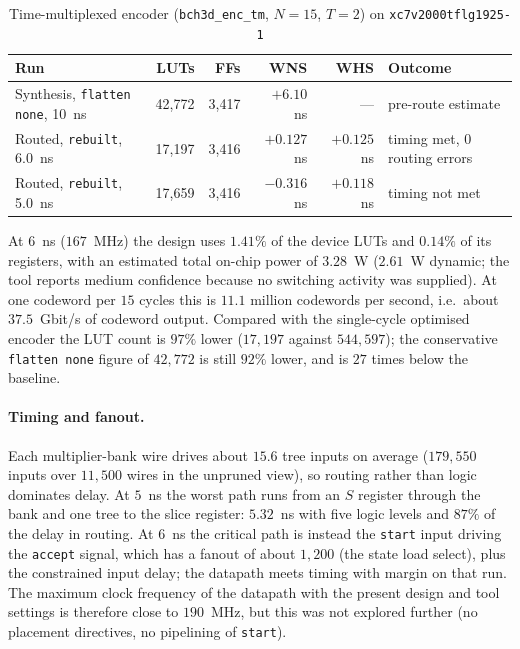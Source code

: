 \documentclass[11pt,a4paper]{article}
\begin{document}
\begin{table}[htbp]
\centering
\caption{Time-multiplexed encoder (\texttt{bch3d\_enc\_tm}, $N=15$, $T=2$) on \texttt{xc7v2000tflg1925-1}}
\label{tab:tm_results}
\vspace{0.2cm}
\begin{tabular}{lrrrrl}
\toprule
\textbf{Run} & \textbf{LUTs} & \textbf{FFs} & \textbf{WNS} & \textbf{WHS} & \textbf{Outcome} \\
\midrule
Synthesis, \texttt{flatten none}, 10~ns & 42,772 & 3,417 & $+6.10$~ns & --- & pre-route estimate \\
Routed, \texttt{rebuilt}, 6.0~ns & 17,197 & 3,416 & $+0.127$~ns & $+0.125$~ns & timing met, 0 routing errors \\
Routed, \texttt{rebuilt}, 5.0~ns & 17,659 & 3,416 & $-0.316$~ns & $+0.118$~ns & timing not met \\
\bottomrule
\end{tabular}
\end{table}

At $6$~ns ($167$~MHz) the design uses $1.41\%$ of the device LUTs and $0.14\%$ of its registers, with an estimated total on-chip power of $3.28$~W ($2.61$~W dynamic; the tool reports medium confidence because no switching activity was supplied). At one codeword per $15$ cycles this is $11.1$ million codewords per second, i.e.\ about $37.5$~Gbit/s of codeword output. Compared with the single-cycle optimised encoder the LUT count is $97\%$ lower ($17,197$ against $544,597$); the conservative \texttt{flatten none} figure of $42,772$ is still $92\%$ lower, and is $27$ times below the baseline.

\paragraph{Timing and fanout.} Each multiplier-bank wire drives about $15.6$ tree inputs on average ($179,550$ inputs over $11,500$ wires in the unpruned view), so routing rather than logic dominates delay. At $5$~ns the worst path runs from an $S$ register through the bank and one tree to the slice register: $5.32$~ns with five logic levels and $87\%$ of the delay in routing. At $6$~ns the critical path is instead the \texttt{start} input driving the \texttt{accept} signal, which has a fanout of about $1,200$ (the state load select), plus the constrained input delay; the datapath meets timing with margin on that run. The maximum clock frequency of the datapath with the present design and tool settings is therefore close to $190$~MHz, but this was not explored further (no placement directives, no pipelining of \texttt{start}).
\end{document}
